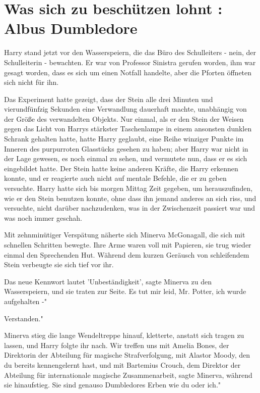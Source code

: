 \chapter{Was sich zu beschützen lohnt : Albus Dumbledore}

Harry stand jetzt vor den Wasserspeiern, die das Büro des Schulleiters - nein,
der Schulleiterin - bewachten. Er war von Professor Sinistra gerufen worden, ihm
war gesagt worden, dass es sich um einen Notfall handelte, aber die Pforten
öffneten sich nicht für ihn.

Das Experiment hatte gezeigt, dass der Stein alle drei Minuten und
vierundfünfzig Sekunden eine Verwandlung dauerhaft machte, unabhängig von der
Größe des verwandelten Objekts. Nur einmal, als er den Stein der Weisen gegen
das Licht von Harrys stärkster Taschenlampe in einem ansonsten dunklen Schrank
gehalten hatte, hatte Harry geglaubt, eine Reihe winziger Punkte im Inneren des
purpurroten Glasstücks gesehen zu haben; aber Harry war nicht in der Lage
gewesen, es noch einmal zu sehen, und vermutete nun, dass er es sich eingebildet
hatte. Der Stein hatte keine anderen Kräfte, die Harry erkennen konnte, und er
reagierte auch nicht auf mentale Befehle, die er zu geben versuchte. Harry hatte
sich bis morgen Mittag Zeit gegeben, um herauszufinden, wie er den Stein
benutzen konnte, ohne dass ihn jemand anderes an sich riss, und versuchte, nicht
darüber nachzudenken, was in der Zwischenzeit passiert war und was noch immer
geschah.

Mit zehnminütiger Verspätung näherte sich Minerva McGonagall, die sich mit
schnellen Schritten bewegte. Ihre Arme waren voll mit Papieren, sie trug wieder
einmal den Sprechenden Hut. Während dem kurzen Geräusch von schleifendem Stein
verbeugte sie sich tief vor ihr.

\glqq{}Das neue Kennwort lautet 'Unbeständigkeit'\grqq{}, sagte Minerva zu den
Wasserspeiern, und sie traten zur Seite. \glqq{}Es tut mir leid, Mr. Potter, ich
wurde aufgehalten -"

\glqq{}Verstanden."

Minerva stieg die lange Wendeltreppe hinauf, kletterte, anstatt sich tragen zu
lassen, und Harry folgte ihr nach. \glqq{}Wir treffen uns mit Amelia Bones, der
Direktorin der Abteilung für magische Strafverfolgung, mit Alastor Moody, den du
bereits kennengelernt hast, und mit Bartemius Crouch, dem Direktor der Abteilung
für internationale magische Zusammenarbeit\grqq{}, sagte Minerva, während sie
hinaufstieg. \glqq{}Sie sind genauso Dumbledores Erben wie du oder ich."

